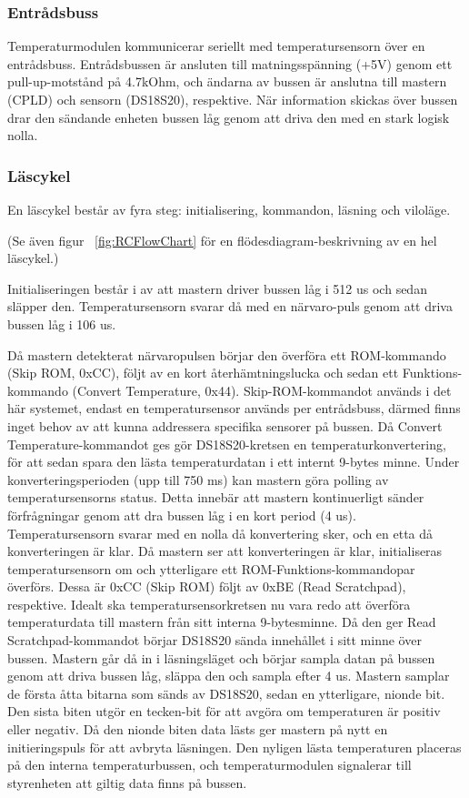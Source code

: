 \documentclass[a4paper,11pt]{article}
\begin{document}
	\subsubsection{Entrådsbuss}

	Temperaturmodulen kommunicerar seriellt med temperatursensorn över en entrådsbuss.
	Entrådsbussen är ansluten till matningsspänning (+5V) genom ett pull-up-motstånd på 4.7kOhm, och
	ändarna av bussen är anslutna till mastern (CPLD) och sensorn (DS18S20), respektive. När information
	skickas över bussen drar den sändande enheten bussen låg genom att driva den
	med en stark logisk nolla.

	\subsubsection{Läscykel}

	En läscykel består av fyra steg: initialisering, kommandon, läsning och viloläge.

	(Se även figur ~\ref{fig:RCFlowChart} för en flödesdiagram-beskrivning av en hel läscykel.)

	Initialiseringen består i av att mastern driver bussen låg i 512 us och sedan släpper den.
	Temperatursensorn svarar då med en närvaro-puls genom att driva bussen låg i 106 us.

	Då mastern detekterat närvaropulsen börjar den överföra ett ROM-kommando (Skip ROM, 0xCC), följt av en kort återhämtningslucka och sedan ett Funktions-kommando (Convert Temperature, 0x44).
	Skip-ROM-kommandot används i det här systemet, endast en temperatursensor används per entrådsbuss, därmed finns inget behov av att kunna addressera specifika sensorer på bussen.
	Då Convert Temperature-kommandot ges gör DS18S20-kretsen en temperaturkonvertering, för att sedan spara den lästa temperaturdatan i ett internt 9-bytes minne.
	Under konverteringsperioden (upp till 750 ms) kan mastern göra polling av temperatursensorns status. Detta innebär att mastern kontinuerligt
	sänder förfrågningar genom att dra bussen låg i en kort period (4 us). Temperatursensorn svarar med en nolla
	då konvertering sker, och en etta då konverteringen är klar.
	Då mastern ser att konverteringen är klar, initialiseras temperatursensorn om och ytterligare ett ROM-Funktions-kommandopar överförs. Dessa är 0xCC (Skip ROM) följt av 0xBE (Read Scratchpad), respektive.
	Idealt ska temperatursensorkretsen nu vara redo att överföra temperaturdata till mastern från sitt interna 9-bytesminne.
	Då den ger Read Scratchpad-kommandot börjar DS18S20 sända innehållet i sitt minne över bussen.
	Mastern går då in i läsningsläget och börjar sampla datan på bussen genom att driva bussen låg, släppa den och sampla efter 4 us.
	Mastern samplar de första åtta bitarna som sänds av DS18S20, sedan en ytterligare, nionde bit. 
	Den sista biten utgör en tecken-bit för att avgöra om temperaturen är positiv eller negativ. Då den nionde biten data lästs
	ger mastern på nytt en initieringspuls för att avbryta läsningen.
	Den nyligen lästa temperaturen placeras på den interna temperaturbussen, och temperaturmodulen signalerar till styrenheten att giltig data finns på bussen.
\end{document}
